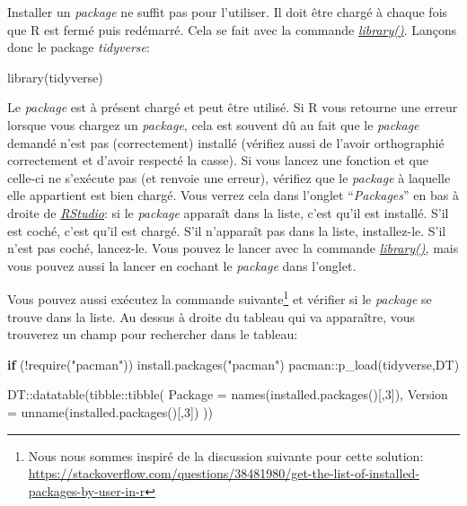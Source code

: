 \documentclass[
]{book}
\newenvironment{Shaded}{\begin{snugshade}}{\end{snugshade}}
\newcommand{\AttributeTok}[1]{\textcolor[rgb]{0.77,0.63,0.00}{#1}}
\newcommand{\ControlFlowTok}[1]{\textcolor[rgb]{0.13,0.29,0.53}{\textbf{#1}}}
\newcommand{\DecValTok}[1]{\textcolor[rgb]{0.00,0.00,0.81}{#1}}
\newcommand{\FunctionTok}[1]{\textcolor[rgb]{0.00,0.00,0.00}{#1}}
\newcommand{\NormalTok}[1]{#1}
\newcommand{\SpecialCharTok}[1]{\textcolor[rgb]{0.00,0.00,0.00}{#1}}
\newcommand{\StringTok}[1]{\textcolor[rgb]{0.31,0.60,0.02}{#1}}
\begin{document}
Installer un \emph{package} ne suffit pas pour l'utiliser. Il doit être chargé à chaque fois que R est fermé puis redémarré. Cela se fait avec la commande \href{https://www.rdocumentation.org/packages/base/versions/3.6.2/topics/library}{\emph{library()}}. Lançons donc le package \emph{tidyverse}:

\begin{Shaded}
\begin{Highlighting}[]
\FunctionTok{library}\NormalTok{(tidyverse)}
\end{Highlighting}
\end{Shaded}

Le \emph{package} est à présent chargé et peut être utilisé. Si R vous retourne une erreur lorsque vous chargez un \emph{package}, cela est souvent dû au fait que le \emph{package} demandé n'est pas (correctement) installé (vérifiez aussi de l'avoir orthographié correctement et d'avoir respecté la casse). Si vous lancez une fonction et que celle-ci ne s'exécute pas (et renvoie une erreur), vérifiez que le \emph{package} à laquelle elle appartient est bien chargé. Vous verrez cela dans l'onglet ``\emph{Packages}'' en bas à droite de \href{https://posit.co/}{\emph{RStudio}}: si le \emph{package} apparaît dans la liste, c'est qu'il est installé. S'il est coché, c'est qu'il est chargé. S'il n'apparaît pas dans la liste, installez-le. S'il n'est pas coché, lancez-le. Vous pouvez le lancer avec la commande \href{https://www.rdocumentation.org/packages/base/versions/3.6.2/topics/library}{\emph{library()}}, mais vous pouvez aussi la lancer en cochant le \emph{package} dans l'onglet.

Vous pouvez aussi exécutez la commande suivante\footnote{Nous nous sommes inspiré de la discussion suivante pour cette solution: \url{https://stackoverflow.com/questions/38481980/get-the-list-of-installed-packages-by-user-in-r}} et vérifier si le \emph{package} se trouve dans la liste. Au dessus à droite du tableau qui va apparaître, vous trouverez un champ pour rechercher dans le tableau:

\begin{Shaded}
\begin{Highlighting}[]
\ControlFlowTok{if}\NormalTok{ (}\SpecialCharTok{!}\FunctionTok{require}\NormalTok{(}\StringTok{"pacman"}\NormalTok{)) }\FunctionTok{install.packages}\NormalTok{(}\StringTok{"pacman"}\NormalTok{)}
\NormalTok{pacman}\SpecialCharTok{::}\FunctionTok{p\_load}\NormalTok{(tidyverse,DT)}

\NormalTok{DT}\SpecialCharTok{::}\FunctionTok{datatable}\NormalTok{(tibble}\SpecialCharTok{::}\FunctionTok{tibble}\NormalTok{(}
     \AttributeTok{Package =} \FunctionTok{names}\NormalTok{(}\FunctionTok{installed.packages}\NormalTok{()[,}\DecValTok{3}\NormalTok{]),}
     \AttributeTok{Version =} \FunctionTok{unname}\NormalTok{(}\FunctionTok{installed.packages}\NormalTok{()[,}\DecValTok{3}\NormalTok{])}
\NormalTok{ ))}
\end{Highlighting}
\end{Shaded}
\end{document}

